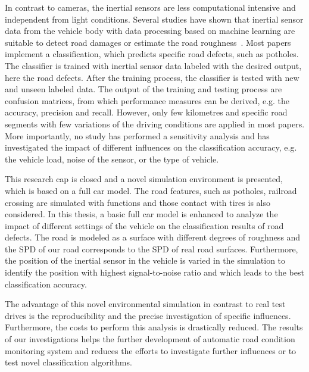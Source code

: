 In contrast to cameras, the inertial sensors are less computational intensive and independent from light conditions.
%
Several studies have shown that inertial sensor data from the vehicle body with data processing based on machine learning are suitable to detect road damages or estimate the road roughness~\cite{eriksson_pothole_2008, Chen.2013, ngwangwa_reconstruction_2010, nitsche_comparison_2012, seraj_roads:_2014}.
%
Most papers implement a classification, which predicts specific road defects, such as potholes.
%
The classifier is trained with inertial sensor data labeled with the desired output, here the road defects.
%
After the training process, the classifier is tested with new and unseen labeled data.
%
The output of the training and testing process are confusion matrices, from which performance measures can be derived, e.g. the accuracy, precision and recall.
%
However, only few kilometres and specific road segments with few variations of the driving conditions are applied in most papers.
%
More importantly, no study has performed a sensitivity analysis and has investigated the impact of different influences on the classification accuracy, e.g. the vehicle load, noise of the sensor, or the type of vehicle.

This research cap is closed and a novel simulation environment is presented, which is based on a full car model. The road features, such as potholes, railroad crossing are simulated with functions and those contact with tires is also considered.
% 
In this thesis, a basic full car model is enhanced to analyze the impact of different settings of the vehicle on the classification results of road defects.
%
The road is modeled as a surface with different degrees of roughness and the \ac{SPD} of our road corresponds to the \ac{SPD} of real road surfaces.
%
Furthermore, the position of the inertial sensor in the vehicle is varied in the simulation to identify the position with highest signal-to-noise ratio and which leads to the best classification accuracy.

The advantage of this novel environmental simulation in contrast to real test drives is the reproducibility and the precise investigation of specific influences.
%
Furthermore, the costs to perform this analysis is drastically reduced.
%
The results of our investigations helps the further development of automatic road condition monitoring system and reduces the efforts to investigate further influences or to test novel classification algorithms.